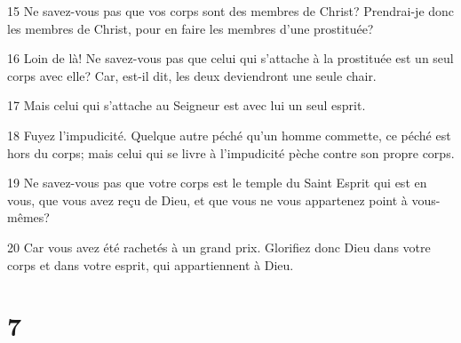 \par 15 Ne savez-vous pas que vos corps sont des membres de Christ? Prendrai-je donc les membres de Christ, pour en faire les membres d'une prostituée?
\par 16 Loin de là! Ne savez-vous pas que celui qui s'attache à la prostituée est un seul corps avec elle? Car, est-il dit, les deux deviendront une seule chair.
\par 17 Mais celui qui s'attache au Seigneur est avec lui un seul esprit.
\par 18 Fuyez l'impudicité. Quelque autre péché qu'un homme commette, ce péché est hors du corps; mais celui qui se livre à l'impudicité pèche contre son propre corps.
\par 19 Ne savez-vous pas que votre corps est le temple du Saint Esprit qui est en vous, que vous avez reçu de Dieu, et que vous ne vous appartenez point à vous-mêmes?
\par 20 Car vous avez été rachetés à un grand prix. Glorifiez donc Dieu dans votre corps et dans votre esprit, qui appartiennent à Dieu.

\chapter{7}

